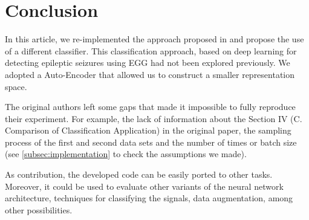 \newpage

\section{Conclusion}\label{sec:concl}
In this article, we re-implemented the approach proposed in \cite{WenZha:2018} and propose the use of a different classifier. This classification approach, based on deep learning for detecting epileptic seizures using EGG had not been explored previously. We adopted a Auto-Encoder that allowed us to construct a smaller representation space.

The original authors left some gaps that made it impossible to fully reproduce their experiment. For example, the lack of information about the Section IV (C. Comparison of Classification Application) in the original paper, the sampling process of the first and second data sets and the number of times or batch size (see \ref{subsec:implementation} to check the assumptions we made).

As contribution, the developed code can be easily ported to other tasks. Moreover, it could be used to evaluate other variants of the neural network architecture, techniques for classifying the signals, data augmentation, among other possibilities.  



